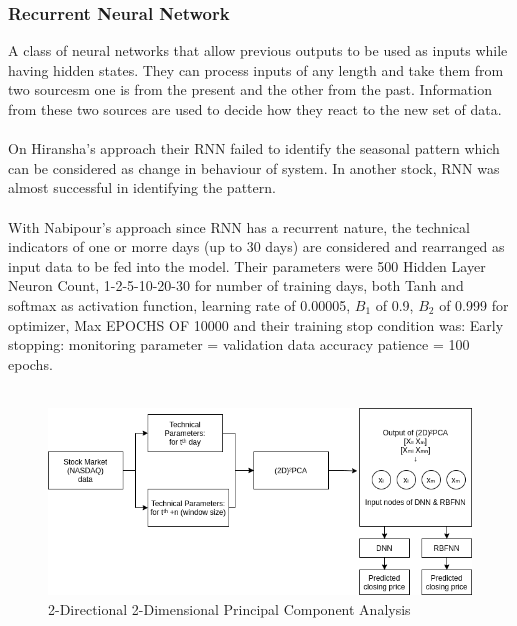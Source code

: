 \documentclass[conference]{IEEEtran}
\begin{document}
\subsubsection{Recurrent Neural Network}
A class of neural networks that allow previous outputs to be used as inputs while having hidden states. They can process inputs of any length and take them from two sourcesm one is from the present
and the other from the past. Information from these two sources are used to decide how they react to the new set of data.
\\\\
On Hiransha's approach \cite{M2018} their RNN failed to identify the seasonal pattern which can be considered as change in behaviour of system. In another stock, RNN was almost successful in 
identifying the pattern.
\\\\
With Nabipour's approach \cite{nabipour2020predicting} since RNN has a recurrent nature, the technical indicators of one or morre days (up to 30 days) are considered and rearranged as input data to be fed into the model. Their parameters were 500 Hidden Layer Neuron Count, 1-2-5-10-20-30 for number of training days, both Tanh and softmax as activation function, learning rate of 0.00005, $B_1$ of 0.9, $B_2$ of 0.999 for optimizer, Max EPOCHS OF 10000 and their training stop condition
was: Early stopping: monitoring parameter = validation data accuracy patience = 100 epochs. 
\\\\
\begin{figure}[htbp]
  \centerline{\includegraphics[scale=.65]{mapita2.png}}
  \caption{2-Directional 2-Dimensional Principal Component Analysis}
  \label{fig}
\end{figure}
\end{document}
